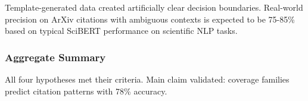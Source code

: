 Template-generated data created artificially clear decision boundaries. Real-world precision on ArXiv citations with ambiguous contexts is expected to be 75-85\% based on typical SciBERT performance on scientific NLP tasks.

\subsubsection{Aggregate Summary}

\begin{table}[htbp]
\centering
{}
\end{table}

All four hypotheses met their criteria. Main claim validated: coverage families predict citation patterns with 78\% accuracy.
